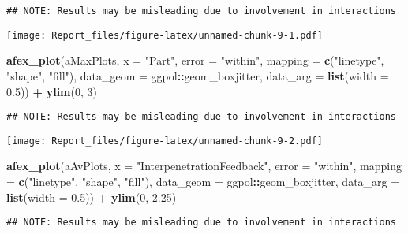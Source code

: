 \documentclass[
]{article}
\newenvironment{Shaded}{\begin{snugshade}}{\end{snugshade}}
\newcommand{\DataTypeTok}[1]{\textcolor[rgb]{0.13,0.29,0.53}{#1}}
\newcommand{\DecValTok}[1]{\textcolor[rgb]{0.00,0.00,0.81}{#1}}
\newcommand{\FloatTok}[1]{\textcolor[rgb]{0.00,0.00,0.81}{#1}}
\newcommand{\KeywordTok}[1]{\textcolor[rgb]{0.13,0.29,0.53}{\textbf{#1}}}
\newcommand{\NormalTok}[1]{#1}
\newcommand{\OperatorTok}[1]{\textcolor[rgb]{0.81,0.36,0.00}{\textbf{#1}}}
\newcommand{\StringTok}[1]{\textcolor[rgb]{0.31,0.60,0.02}{#1}}
\begin{document}
\begin{verbatim}
## NOTE: Results may be misleading due to involvement in interactions
\end{verbatim}

\texttt{[image: Report\_files/figure-latex/unnamed-chunk-9-1.pdf]}

\begin{Shaded}
\begin{Highlighting}[]
\KeywordTok{afex_plot}\NormalTok{(aMaxPlots, }\DataTypeTok{x =} \StringTok{"Part"}\NormalTok{, }\DataTypeTok{error =} \StringTok{"within"}\NormalTok{, }
                \DataTypeTok{mapping =} \KeywordTok{c}\NormalTok{(}\StringTok{"linetype"}\NormalTok{, }\StringTok{"shape"}\NormalTok{, }\StringTok{"fill"}\NormalTok{),}
                \DataTypeTok{data_geom =}\NormalTok{ ggpol}\OperatorTok{::}\NormalTok{geom_boxjitter, }
                \DataTypeTok{data_arg =} \KeywordTok{list}\NormalTok{(}\DataTypeTok{width =} \FloatTok{0.5}\NormalTok{))  }\OperatorTok{+}
\StringTok{            }\KeywordTok{ylim}\NormalTok{(}\DecValTok{0}\NormalTok{, }\DecValTok{3}\NormalTok{)}
\end{Highlighting}
\end{Shaded}

\begin{verbatim}
## NOTE: Results may be misleading due to involvement in interactions
\end{verbatim}

\texttt{[image: Report\_files/figure-latex/unnamed-chunk-9-2.pdf]}

\begin{Shaded}
\begin{Highlighting}[]
\KeywordTok{afex_plot}\NormalTok{(aAvPlots, }\DataTypeTok{x =} \StringTok{"InterpenetrationFeedback"}\NormalTok{, }\DataTypeTok{error =} \StringTok{"within"}\NormalTok{, }
                \DataTypeTok{mapping =} \KeywordTok{c}\NormalTok{(}\StringTok{"linetype"}\NormalTok{, }\StringTok{"shape"}\NormalTok{, }\StringTok{"fill"}\NormalTok{),}
                \DataTypeTok{data_geom =}\NormalTok{ ggpol}\OperatorTok{::}\NormalTok{geom_boxjitter, }
                \DataTypeTok{data_arg =} \KeywordTok{list}\NormalTok{(}\DataTypeTok{width =} \FloatTok{0.5}\NormalTok{)) }\OperatorTok{+}
\StringTok{            }\KeywordTok{ylim}\NormalTok{(}\DecValTok{0}\NormalTok{, }\FloatTok{2.25}\NormalTok{)}
\end{Highlighting}
\end{Shaded}

\begin{verbatim}
## NOTE: Results may be misleading due to involvement in interactions
\end{verbatim}
\end{document}

